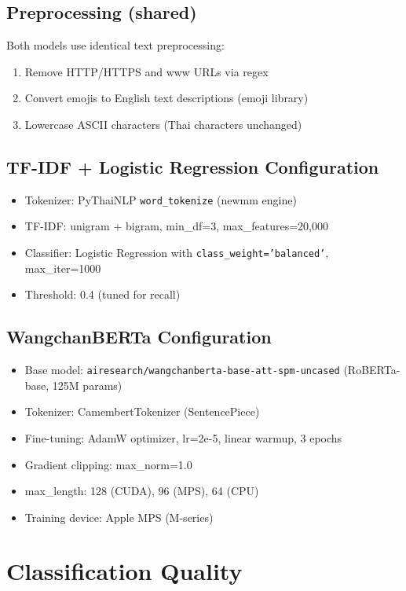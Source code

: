 \documentclass[11pt,a4paper]{article}
\begin{document}
\subsection{Preprocessing (shared)}
Both models use identical text preprocessing:
\begin{enumerate}[nosep]
    \item Remove HTTP/HTTPS and www URLs via regex
    \item Convert emojis to English text descriptions (emoji library)
    \item Lowercase ASCII characters (Thai characters unchanged)
\end{enumerate}

\subsection{TF-IDF + Logistic Regression Configuration}
\begin{itemize}[nosep]
    \item Tokenizer: PyThaiNLP \texttt{word\_tokenize} (newmm engine)
    \item TF-IDF: unigram + bigram, min\_df=3, max\_features=20,000
    \item Classifier: Logistic Regression with \texttt{class\_weight='balanced'}, max\_iter=1000
    \item Threshold: 0.4 (tuned for recall)
\end{itemize}

\subsection{WangchanBERTa Configuration}
\begin{itemize}[nosep]
    \item Base model: \texttt{airesearch/wangchanberta-base-att-spm-uncased} (RoBERTa-base, 125M params)
    \item Tokenizer: CamembertTokenizer (SentencePiece)
    \item Fine-tuning: AdamW optimizer, lr=2e-5, linear warmup, 3 epochs
    \item Gradient clipping: max\_norm=1.0
    \item max\_length: 128 (CUDA), 96 (MPS), 64 (CPU)
    \item Training device: Apple MPS (M-series)
\end{itemize}

\section{Classification Quality}
\end{document}
